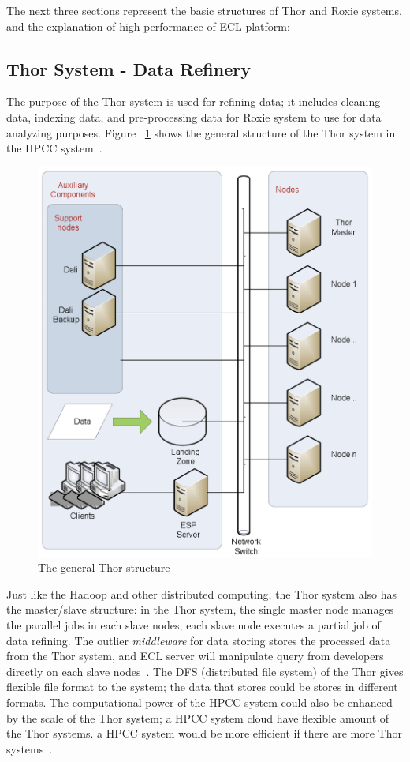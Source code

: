 The next three sections represent the basic structures of Thor and Roxie systems, and the explanation of high performance of ECL platform:

\subsection{Thor System - Data Refinery}

The purpose of the Thor system is used for refining data; it includes cleaning data, indexing data, and pre-processing data for Roxie system to use for data analyzing purposes. Figure ~\ref{f:thor} shows the general structure of the Thor system in the HPCC system~\cite{Intro4}.

\begin{figure}[!ht]
\centering\includegraphics[width=\columnwidth]{images/thor.png}
\caption{The general Thor structure}\label{f:thor}
\end{figure}

Just like the Hadoop and other distributed computing, the Thor system also has the master/slave structure: in the Thor system, the single master node manages the parallel jobs in each slave nodes, each slave node executes a partial job of data refining. The outlier \textit{middleware} for data storing stores the processed data from the Thor system, and ECL server will manipulate query from developers directly on each slave nodes~\cite{Intro4}. The DFS (distributed file system) of the Thor gives flexible file format to the system; the data that stores could be stores in different formats. The computational power of the HPCC system could also be enhanced by the scale of the Thor system; a HPCC system cloud have flexible amount of the Thor systems. a HPCC system would be more efficient if there are more Thor systems~\cite{Intro4}.

